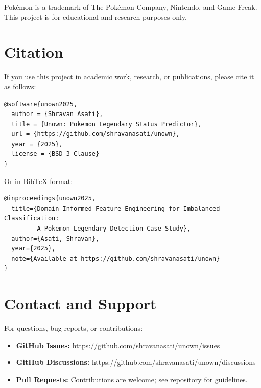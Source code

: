 Pokémon is a trademark of The Pokémon Company, Nintendo, and Game Freak. This project is for educational and research purposes only.

\section{Citation}
\label{app:citation}

If you use this project in academic work, research, or publications, please cite it as follows:

\begin{verbatim}
@software{unown2025,
  author = {Shravan Asati},
  title = {Unown: Pokemon Legendary Status Predictor},
  url = {https://github.com/shravanasati/unown},
  year = {2025},
  license = {BSD-3-Clause}
}
\end{verbatim}

Or in BibTeX format:

\begin{verbatim}
@inproceedings{unown2025,
  title={Domain-Informed Feature Engineering for Imbalanced Classification: 
         A Pokemon Legendary Detection Case Study},
  author={Asati, Shravan},
  year={2025},
  note={Available at https://github.com/shravanasati/unown}
}
\end{verbatim}

\section{Contact and Support}
\label{app:contact}

For questions, bug reports, or contributions:

\begin{itemize}
  \item \textbf{GitHub Issues:} \url{https://github.com/shravanasati/unown/issues}
  \item \textbf{GitHub Discussions:} \url{https://github.com/shravanasati/unown/discussions}
  \item \textbf{Pull Requests:} Contributions are welcome; see repository for guidelines.
\end{itemize}
